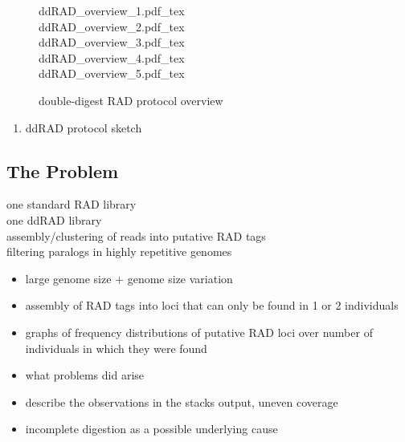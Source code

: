 \documentclass[a4paper,12pt,times,print,index, custombib]{PhDThesisPSnPDF}\usepackage[]{graphicx}\usepackage[]{color}
\begin{document}
\begin{figure}
\def\svgwidth{.9\textwidth}
{ddRAD_overview_1.pdf_tex}\\ 
\def\svgwidth{\textwidth}
{ddRAD_overview_2.pdf_tex}\\
\def\svgwidth{.9\textwidth}
{ddRAD_overview_3.pdf_tex}\\
\def\svgwidth{.9\textwidth}
{ddRAD_overview_4.pdf_tex}\\
\def\svgwidth{.9\textwidth}
{ddRAD_overview_5.pdf_tex}
\caption{double-digest RAD protocol overview}
\label{ddRAD_protocol_overview}
\end{figure}



\begin{enumerate}
\item ddRAD protocol sketch
\end{enumerate}

\subsection{The Problem}
one standard RAD library \\
one ddRAD library \\
assembly/clustering of reads into putative RAD tags \\
filtering paralogs in highly repetitive genomes \\


\begin{itemize}
\item large genome size $+$ genome size variation
\item assembly of RAD tags into loci that can only be found in 1 or 2 individuals
\item graphs of frequency distributions of putative RAD loci over number of individuals in which they were found
\end{itemize}

\begin{itemize}
\item what problems did arise
\item describe the observations in the stacks output, uneven coverage
\item incomplete digestion as a possible underlying cause
\end{itemize}
\end{document}
